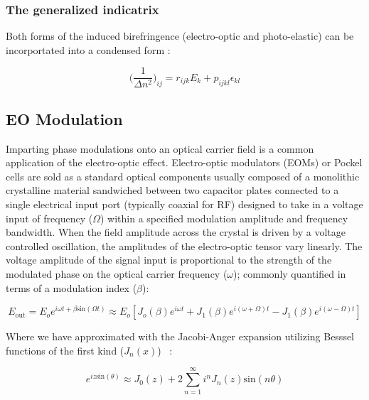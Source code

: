 \subsubsection{The generalized indicatrix}
Both forms of the induced birefringence (electro-optic and photo-elastic) can be incorportated into a condensed form \cite{nye}:

\begin{equation}\label{eq:indicgen}
	\bigg( \frac{1}{\Delta n^2} \bigg)_{ij} = r_{ijk}E_k + p_{ijkl} \epsilon_{kl}
\end{equation}



\subsection{EO Modulation}\label{sec:EOM}
Imparting phase modulations onto an optical carrier field is a common application of the electro-optic effect. Electro-optic modulators (EOMs) or Pockel cells are sold as a standard optical components usually composed of a monolithic crystalline material sandwiched between two capacitor plates connected to a single electrical input port (typically coaxial for RF) designed to take in a voltage input of frequency ($\Omega$) within a specified modulation amplitude and frequency bandwidth. When the field amplitude across the crystal is driven by a voltage controlled oscillation, the amplitudes of the electro-optic tensor vary linearly. The voltage amplitude of the signal input is proportional to the strength of the modulated phase on the optical carrier frequency ($\omega$); commonly quantified in terms of a modulation index ($\beta$):


\begin{equation}\label{eq:inpEOM}
	E_\mathrm{out} = E_o e^{i \omega t + \beta \mathrm{sin}( \Omega t)} \approx E_o [J_o(\beta)e^{i \omega t} + J_1(\beta) e^{i(\omega + \Omega)t} - J_1(\beta) e^{i(\omega - \Omega)t}]  
\end{equation}

\noindent Where we have approximated with the Jacobi-Anger expansion utilizing Besssel functions of the first kind ($J_n(x)$) ~\cite{oliver:1972}:

\begin{equation}\label{eq:jacobianger}
	e^{iz \mathrm{sin}(\theta)} \approx J_0(z) + 2 \sum_{n=1}^{\infty} i^n J_n(z) \mathrm{sin} (n \theta)
\end{equation}

